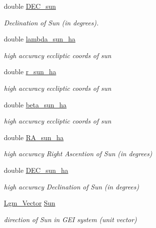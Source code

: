 \begin{CompactItemize}
double \hyperlink{struct_lgm___c_trans_b19a9ee35ac020d246368a77d45f24fc}{DEC\_\-sun}
\begin{CompactList}\small\item\em Declination of Sun (in degrees). \item\end{CompactList}\item 
double \hyperlink{struct_lgm___c_trans_7ffa9e1f08f4d0cb1e671f68a3e02795}{lambda\_\-sun\_\-ha}
\begin{CompactList}\small\item\em high accuracy eccliptic coords of sun \item\end{CompactList}\item 
double \hyperlink{struct_lgm___c_trans_6a356ec9b9109cc0b9839cd61cffab28}{r\_\-sun\_\-ha}
\begin{CompactList}\small\item\em high accuracy eccliptic coords of sun \item\end{CompactList}\item 
double \hyperlink{struct_lgm___c_trans_68c9bad85ddaa182e024fb793c0cf7a2}{beta\_\-sun\_\-ha}
\begin{CompactList}\small\item\em high accuracy eccliptic coords of sun \item\end{CompactList}\item 
double \hyperlink{struct_lgm___c_trans_82cbad2cb80fd7db9be45cd4c1044587}{RA\_\-sun\_\-ha}
\begin{CompactList}\small\item\em high accuracy Right Ascention of Sun (in degrees) \item\end{CompactList}\item 
double \hyperlink{struct_lgm___c_trans_970dd30b9acfc69613ebe93c102ccdc7}{DEC\_\-sun\_\-ha}
\begin{CompactList}\small\item\em high accuracy Declination of Sun (in degrees) \item\end{CompactList}\item 
\hyperlink{struct_lgm___vector}{Lgm\_\-Vector} \hyperlink{struct_lgm___c_trans_ba9ef9d70bc79513848a5fe50faed070}{Sun}
\begin{CompactList}\small\item\em direction of Sun in GEI system (unit vector) \item\end{CompactList}\item 

\end{CompactItemize}
